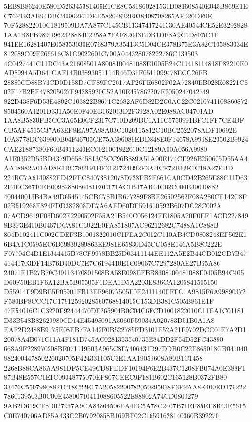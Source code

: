 \documentclass[UTF8,fontset=fandol,zihao=-4,a4paper]{ctexart}
\begin{document}
{{5EB8B86240E580D526345381406E1CE8C581860281531D081608540E045B869E1EC76F193AB94DBC40902E1DED58204822B038408708265AE020DF9E
70F528822010C1819509DA7A877C145CB11347417241330AE40544CE52E32928281AA1B8FB989D962328884F2258A7FAF82043EDB1DF8A9C1D8E5C1F
941EE16281407E058353030E0768379A35413C5D04CE378B75E3A82C105883034E812089C09F266616C81C9022601C700A044328078222786C139503
4C0427441C11DC43A21608501A8008100481088E1005B24C10418114818F82210E0AD8994A5D641CAF14B03893051114B46D31F0511099478ECC26FB
28889CD88B73CD0D158D7CF89FC2017AF26FE6802F02A72840EB028E08221C502F17B2BE478205027F94385920C52A10E457862207E2050247042749
822D438F6D53E4802C103822B8671C2682AF6D82D2C0AC22C02107411088608728504560A1201D331A50E0F40EB162013D2F3928A02E088AC04701AD
1AA8B5830FB5CC3A65E0CF2317C710D209BC0A11C5750991BFC1FF7CE4BFCB5AF4565C37A63EF8EA97A98A03C1020115812C10BC2522078ADF10692E
10A8778DC639900B04F46705CE75A396089EDD848E0F14678A9908E20502B9924CAE21887380F60B4911240EC0021001822010C12189A00A056A9980
A1E0352D55BD4379D65845813C5CC96B889A51A00E174CE926B250605D55AA4AA18882A01AD8E1BC78C191BF3121724B92F3ABCE72B12E1C18A27EBD
224BC7A6140882FD42FEC84073812078D728FB2E661CA0CD42B265E88C11D632F4EC36710EB0098288086481E0E171AC1B47AB44C02C000E40040882
400440013B4BA49D6545145CBC78B1B677289F8BE26502562F08A280CE142C8F02B519268E824FDD382808DE7A6AFD60DF591610592B607DC28C002A
07ACD9619F03D602E2290502F55A21B540C056124FE1805A20F0EF1ACD2278498B3F3E400B0467DCA81C6022B0FA851807AC96212682C7488A1C888B
804D102411C002CDEF3B1001822010C1FEA2C012C110AB4CD0808248EF502E16B4A1C0595EC6B69839289863EE981E65830D45CC058E146A5B8C222E
F07704C4D1E1344415B78CF9978BB25D03411144EE112A5E2B44CB012CD7B4741441703DF14B76D40DC5E7C6194410E1C09067C7297280AE27B65A86
24071E1B27B70C49113470801508BA58E098EFBB8308100481088E0405B94C405D60F50EB1F6A12BA5B05505F1DEA1D5A2203E836CA1205841505150
D55914F9D9BE5F05901FB13EF96077505F0E2411140FFFC1A9815F6A99890372F580BF8CCC17C17912592028560768814015C153DB381C505B861E1F
47E54016C1C3220F92444470DF265904B0C04C6FCD1001822010C11EA1C01181D33B548B82629980CD14E45495091A5060F59034A020783D51B0A1A8
EAF2D2488B9175E08FB7FA142F0B522785FD3101F52A21F9702DCC01E7A2D120078A4B071C11A4F181D745AC0281353540735E84DD2F54D52FC43890
668A9F228970208BE071119503A965C8E7406431D97DDB0C22E865018CB041040882400447850226020705F424331105C3E1AA19059608A80B1C1458
2268B88CA86AA981DF5CE49CD8FDDF10194F6E2B437C1208FB074A0E388F187B48E557C1E1C09048775070EF807CEEC9F181B602C165128B0372FB80
33476C55079808821C18C22E17A20582200782050295038F3EFAA8E400ED1792227860139503B0C00E45800710411088605522E88802A74CD0800279
9AB2D619CF8D027937A9CA84864506EA4FC5A78C2407B71EF85EF8B43E5615C0E740706AD85A433C2B07920858B169BE02C16591628140360B392270
}}
\end{document}
